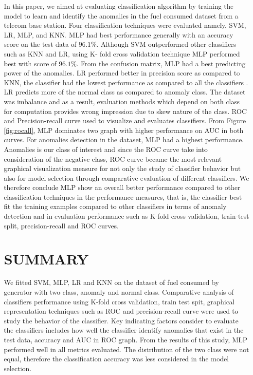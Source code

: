 \documentclass[final,5p,times,twocolumn,authoryear]{elsarticle}
\begin{document}
In this paper, we aimed at evaluating classification algorithm by training the model to learn and identify the anomalies in the fuel consumed dataset from a telecom base station. Four classification techniques were evaluated namely, SVM, LR, MLP, and KNN. MLP had best performance generally with an accuracy score on the test data of $96.1\%$. Although SVM outperformed other classifiers such as KNN and LR, using K- fold cross validation technique MLP performed best with score of $96.1\%$. From the confusion matrix, MLP had a best predicting power of the anomalies. LR performed better in precision score as compared to KNN, the classifier had the lowest performance as compared to all the classifiers . LR predicts more of the normal class as compared to anomaly class. The dataset was imbalance and as a result, evaluation methods which depend on both class for computation  provides wrong impression due to skew nature of the class.  ROC and Precision-recall curve used to visualize and evaluates classifiers. From Figure \ref{fig:rocall}, MLP dominates two graph with higher performance on AUC in both curves. 
For anomalies detection in the dataset, MLP had a highest performance. Anomalies is our class of interest and since the ROC curve take into consideration of the negative class, ROC curve became the most relevant graphical visualization measure for not only the study of classifier behavior but also for model selection through comparative  evaluation of different classifiers. We therefore  conclude MLP show an overall better performance compared to other classification techniques in the performance measures, that is, the classifier  best fit the training examples compared to other classifiers in terms of  anomaly detection and in evaluation performance such as K-fold cross validation, train-test split, precision-recall and ROC curves.  




\section{SUMMARY}
We fitted SVM, MLP, LR and KNN on the dataset of  fuel consumed by generator with two class, anomaly and normal class. Comparative analysis of classifiers performance using K-fold cross validation, train test spit, graphical representation techniques such as ROC and precision-recall curve were used to study the behavior of the classifier. Key indicating factors consider to evaluate the classifiers includes how well the classifier identify anomalies that exist in the test data, accuracy and AUC in ROC graph. From the results of this study, MLP performed well in all metrics evaluated. The distribution of the two class were not equal, therefore the classification accuracy was less considered in the model selection. 
\end{document}
